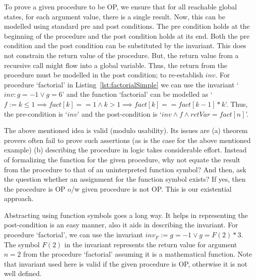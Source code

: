 \documentclass{llncs}
\newcommand{\inv}{\mathit{inv}}
\newcommand{\retVar}{\textit{retVar}}
\newcommand{\F}{\mathit{F}}
\newcommand{\fact}{\mathit{fact}}
\begin{document}
To prove a given procedure to be OP, we ensure that for all
reachable global states, for each argument value, there is a single
result. Now, this can be modelled using standard pre and post
conditions. The pre condition holds at the beginning of the procedure
and the post condition holds at its end. Both the pre condition and
the post condition can be substituted by the invariant. This does
not constrain the return value of the procedure. But, the return value
from a recursive call might flow into a global variable. Thus,
the return from the procedure must be modelled in the post condition;
to re-establish $\inv$.
For procedure `factorial' in Listing~\ref{lst:factorialSimple} we can
use the invariant `$\inv : g = -1 \vee g = 6$' and the function
`factorial' can be modelled as `$ f := k \leq 1 \implies \fact[k] == 1
\wedge k >1 \implies \fact[k] == \fact[k-1]*k$'. Thus, the
pre-condition is `$\inv$' and the post-condition is `$\inv \wedge f
\wedge \retVar = fact[n]$'.

The above mentioned idea is valid (modulo usability). Its issues are
(a) theorem provers often fail to prove such assertions (as is the
case for the above mentioned example) (b) describing the procedure in
logic takes considerable effort.  Instead of formalizing the function
for the given procedure, why not equate the result from the procedure
to that of an uninterpreted function symbol?  And then, ask the
question whether an assignment for the function symbol exists? If yes,
then the procedure is OP o/w given procedure is not OP.
This is our existential approach.

Abstracting using function symbols goes a long way. It helps in
representing the post-condition is an easy manner, also it aids in
describing the invariant. 
For procedure `factorial', we can use the invariant $\inv_{\F}:=g = -1
\vee g = \F(2) * 3$. The symbol $\F(2)$ in the invariant represents
the return value for argument $n = 2$ from the procedure `factorial'
assuming it is a mathematical function. Note that invariant used here
is valid if the given procedure is OP, otherwise it is not well
defined.
\end{document}
